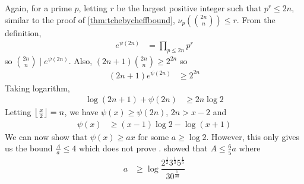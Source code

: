 \documentclass[elemannt.tex]{subfile}
\begin{document}
			Again, for a prime $p$, letting $r$ be the largest positive integer such that $p^{r}\leq 2n$, similar to the proof of \autoref{thm:tchebycheffbound}, $\nu_{p}\left(\binom{2n}{n}\right)\leq r$. From the definition,
				\begin{align*}
					e^{\psi(2n)}
						& = \prod_{p\leq 2n}p^{r}
				\end{align*}
			so $\binom{2n}{n}\mid e^{\psi(2n)}$. Also, $(2n+1)\binom{2n}{n}\geq 2^{2n}$ so
				\begin{align*}
					(2n+1)e^{\psi(2n)}
						& \geq 2^{2n}
				\end{align*}
			Taking logarithm,
				\begin{align*}
					\log{(2n+1)}+\psi(2n)
						& \geq 2n\log{2}
				\end{align*}
			Letting $\floor{\frac{x}{2}}=n$, we have $\psi(x)\geq\psi(2n)$, $2n>x-2$ and
				\begin{align*}
					\psi(x)
						& \geq (x-1)\log{2}-\log{(x+1)}
				\end{align*}
	We can now show that $\psi(x)\geq ax$ for some $a\geq\log{2}$. However, this only gives us the bound $\frac{A}{a}\leq4$ which does not prove . \textcite[$\S4$, eqn. $(5)$ pp. 376]{tschebischeff_1852} showed that $A\leq\frac{6}{5}a$ where
		\begin{align*}
			a
				& \geq \log{\dfrac{2^{\frac{1}{2}}3^{\frac{1}{3}}5^{\frac{1}{5}}}{30^{\frac{1}{30}}}}
		\end{align*}
\end{document}
